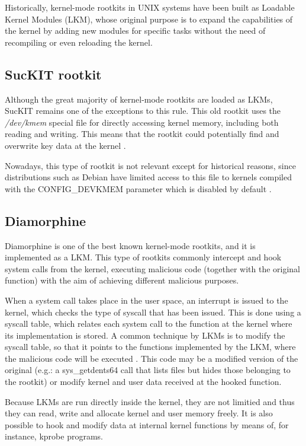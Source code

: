 Historically, kernel-mode rootkits in UNIX systems have been built as
Loadable Kernel Modules (LKM), whose original purpose is to expand the
capabilities of the kernel by adding new modules for specific tasks without
the need of recompiling or even reloading the kernel.

\subsection{SucKIT rootkit}
Although the great majority of kernel-mode rootkits are loaded as LKMs,
SucKIT \cite{suckit_rootkit} remains one of the exceptions to this rule.
This old rootkit uses the \textit{/dev/kmem} special file \cite{dev_kmem}
for directly accessing kernel memory, including both reading and writing.
This means that the rootkit could potentially find and overwrite key data
at the kernel \cite{suckit_lasamhna}.

Nowadays, this type of rootkit is not relevant except for historical
reasons, since distributions such as Debian have limited access to this file to
kernels compiled with the CONFIG\_DEVKMEM parameter \cite{dev_kmem_debian}
which is disabled by default \cite{dev_kmem_off_default}.

\subsection{Diamorphine}
Diamorphine \cite{diamorphine_github} is one of the best known kernel-mode
rootkits, and it is implemented as a LKM. This type of rootkits commonly
intercept and hook system calls from the kernel, executing malicious code
(together with the original function) with the aim of achieving different
malicious purposes.

When a system call takes place in the user space, an interrupt is issued to
the kernel, which checks the type of syscall that has been issued. This is
done using a syscall table, which relates each system call to the function
at the kernel where its implementation is stored. A common technique by
LKMs is to modify the syscall table, so that it points to the functions
implemented by the LKM, where the malicious code will be executed
\cite{incibe_rootkit_lkm}. This code may be a modified version of the
original (e.g.: a sys\_getdents64 call that lists files but hides those
belonging to the rootkit) or modify kernel and user data received at the
hooked function.

Because LKMs are run directly inside the kernel, they are not limitied and thus
they can read, write and allocate kernel and user memory freely. It is also
possible to hook and modify data at internal kernel functions by means of,
for instance, kprobe programs.

